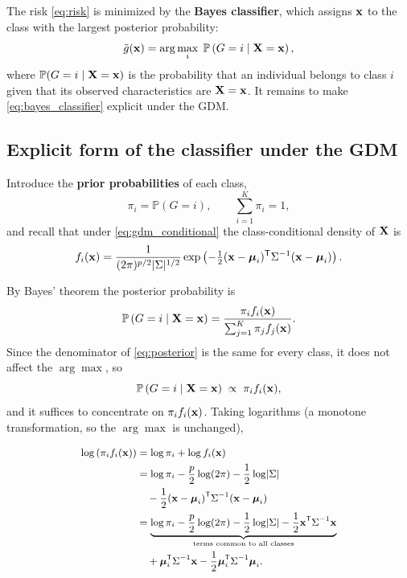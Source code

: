 The risk \eqref{eq:risk} is minimized by the \textbf{Bayes classifier}, which
assigns $\mathbf{x}$ to the class with the largest posterior probability:
\begin{equation}
  \label{eq:bayes_classifier}
  \tilde{g}(\mathbf{x})=\arg\max_{i}\;
    \mathbb{P}\left( G=i\mid\mathbf{X}=\mathbf{x} \right),
\end{equation}
where $\mathbb{P}(G=i\mid\mathbf{X}=\mathbf{x})$ is the probability that an individual
belongs to class $i$ given that its observed characteristics are
$\mathbf{X}=\mathbf{x}$. It remains to make \eqref{eq:bayes_classifier} explicit under
the GDM.

\subsection{Explicit form of the classifier under the GDM}
\label{subsec:linear_discriminant_functions}

Introduce the \textbf{prior probabilities} of each class,
\begin{equation}
  \label{eq:priors}
  \pi_i=\mathbb{P}(G=i),
  \qquad \sum_{i=1}^{K}\pi_i=1,
\end{equation}
and recall that under \eqref{eq:gdm_conditional} the class-conditional density
of $\mathbf{X}$ is
\begin{equation}
  \label{eq:class_density}
  f_i(\mathbf{x})=\frac{1}{(2\pi)^{p/2}\lvert \Sigma \rvert^{1/2}}
  \exp\left( -\tfrac{1}{2}(\mathbf{x}-\boldsymbol{\mu}_i)^{\mathsf{T}}\Sigma^{-1}(\mathbf{x}-\boldsymbol{\mu}_i) \right).
\end{equation}

By Bayes' theorem the posterior probability is
\begin{equation}
  \label{eq:posterior}
  \mathbb{P}\left( G=i\mid\mathbf{X}=\mathbf{x} \right)
  =\frac{\pi_i f_i(\mathbf{x})}{\sum_{j=1}^{K}\pi_j f_j(\mathbf{x})}.
\end{equation}
Since the denominator of \eqref{eq:posterior} is the same for every class, it
does not affect the $\arg\max$, so
\begin{equation}
  \label{eq:posterior_prop}
  \mathbb{P}\left( G=i\mid\mathbf{X}=\mathbf{x} \right)\;\propto\;\pi_i f_i(\mathbf{x}),
\end{equation}
and it suffices to concentrate on $\pi_i f_i(\mathbf{x})$. Taking logarithms (a
monotone transformation, so the $\arg\max$ is unchanged),

\begin{equation}
  \label{eq:log_posterior}
  \small
  \begin{aligned}
    \log\left( \pi_i f_i(\mathbf{x}) \right)
      &=\log\pi_i+\log f_i(\mathbf{x})\\
      &=\log\pi_i-\frac{p}{2}\log(2\pi)-\frac{1}{2}\log\lvert \Sigma \rvert\\
      &\quad-\frac{1}{2}(\mathbf{x}-\boldsymbol{\mu}_i)^{\mathsf{T}}\Sigma^{-1}(\mathbf{x}-\boldsymbol{\mu}_i)\\
      &=\underbrace{\log\pi_i-\frac{p}{2}\log(2\pi)
        -\frac{1}{2}\log\lvert \Sigma \rvert
        -\frac{1}{2}\mathbf{x}^{\mathsf{T}}\Sigma^{-1}\mathbf{x}}_{\text{terms common to all classes}}\\
      &\quad+\boldsymbol{\mu}_i^{\mathsf{T}}\Sigma^{-1}\mathbf{x}
        -\frac{1}{2}\boldsymbol{\mu}_i^{\mathsf{T}}\Sigma^{-1}\boldsymbol{\mu}_i .
  \end{aligned}
\end{equation}

